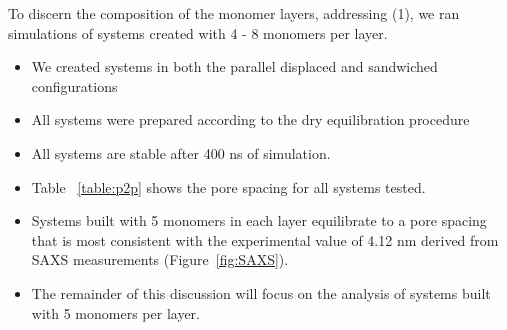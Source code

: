 \documentclass{article}
\begin{document}
  To discern the composition of the monomer layers, addressing (1), we ran
  simulations of systems created with 4 - 8 monomers per layer.  %
  \begin{itemize}
        \item We created systems in both the parallel displaced and sandwiched configurations
	\item All systems were prepared according to the dry equilibration procedure
        \item All systems are stable after 400 ns of simulation.  
        \item Table ~\ref{table:p2p} shows the pore spacing for all systems tested.
        \item Systems built with 5 monomers in each layer equilibrate to a pore spacing
        that is most consistent with the experimental value of 4.12 nm derived from
        SAXS measurements (Figure~\ref{fig:SAXS}).
        \item The remainder of this discussion will focus on the analysis of systems
        built with 5 monomers per layer.
  \end{itemize}
\end{document}
